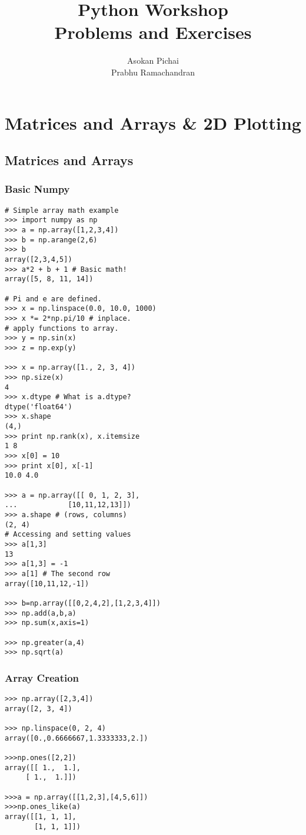 \documentclass[12pt]{article}
\title{Python Workshop\\Problems and Exercises}
\author{Asokan Pichai\\Prabhu Ramachandran}
\begin{document}
\maketitle

\section{Matrices and Arrays \& 2D Plotting}
\subsection{Matrices and Arrays}
\subsubsection{Basic Numpy}
\begin{verbatim}
# Simple array math example
>>> import numpy as np
>>> a = np.array([1,2,3,4])
>>> b = np.arange(2,6)
>>> b
array([2,3,4,5])
>>> a*2 + b + 1 # Basic math!
array([5, 8, 11, 14])

# Pi and e are defined.
>>> x = np.linspace(0.0, 10.0, 1000)
>>> x *= 2*np.pi/10 # inplace.
# apply functions to array.
>>> y = np.sin(x)
>>> z = np.exp(y)

>>> x = np.array([1., 2, 3, 4])
>>> np.size(x)
4
>>> x.dtype # What is a.dtype?
dtype('float64')
>>> x.shape
(4,)
>>> print np.rank(x), x.itemsize
1 8
>>> x[0] = 10
>>> print x[0], x[-1]
10.0 4.0

>>> a = np.array([[ 0, 1, 2, 3],
...            [10,11,12,13]])
>>> a.shape # (rows, columns)
(2, 4)
# Accessing and setting values
>>> a[1,3] 
13
>>> a[1,3] = -1
>>> a[1] # The second row
array([10,11,12,-1])

>>> b=np.array([[0,2,4,2],[1,2,3,4]])
>>> np.add(a,b,a)
>>> np.sum(x,axis=1)

>>> np.greater(a,4)
>>> np.sqrt(a)
\end{verbatim}

\subsubsection{Array Creation}
\begin{verbatim}
>>> np.array([2,3,4])  
array([2, 3, 4])

>>> np.linspace(0, 2, 4)   
array([0.,0.6666667,1.3333333,2.])

>>>np.ones([2,2])
array([[ 1.,  1.],
     [ 1.,  1.]])

>>>a = np.array([[1,2,3],[4,5,6]])
>>>np.ones_like(a)
array([[1, 1, 1],
       [1, 1, 1]])
\end{verbatim}
\end{document}
